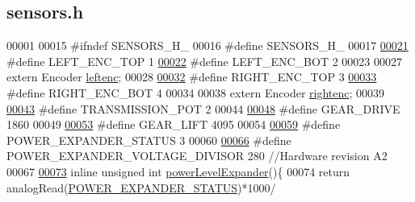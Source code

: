 \hypertarget{sensors_8h_source}{}\subsection{sensors.\+h}
\label{sensors_8h_source}

\begin{DoxyCode}
00001 
00015 \textcolor{preprocessor}{#ifndef SENSORS\_H\_}
00016 \textcolor{preprocessor}{#define SENSORS\_H\_}
00017 
\hypertarget{sensors_8h_source.tex_l00021}{}\hyperlink{sensors_8h_ad0ae0aded49835e75c52bc506585f5a6}{00021} \textcolor{preprocessor}{#define LEFT\_ENC\_TOP 1}
\hypertarget{sensors_8h_source.tex_l00022}{}\hyperlink{sensors_8h_ae913e0b80ef027d0a619e59a3d2ffb85}{00022} \textcolor{preprocessor}{#define LEFT\_ENC\_BOT 2}
00023 
00027 \textcolor{keyword}{extern} Encoder \hyperlink{sensors_8h_a48ead63071a2b65b87a166928a5a5c08}{leftenc};
00028 
\hypertarget{sensors_8h_source.tex_l00032}{}\hyperlink{sensors_8h_a07c1c0ceab9fee6088955b2b2706e515}{00032} \textcolor{preprocessor}{#define RIGHT\_ENC\_TOP 3}
\hypertarget{sensors_8h_source.tex_l00033}{}\hyperlink{sensors_8h_a76290ef36d8c093e1d380e26d1d01f6a}{00033} \textcolor{preprocessor}{#define RIGHT\_ENC\_BOT 4}
00034 
00038 \textcolor{keyword}{extern} Encoder \hyperlink{sensors_8h_a8c853ba918673c4878ab6935c54969e4}{rightenc};
00039 
\hypertarget{sensors_8h_source.tex_l00043}{}\hyperlink{sensors_8h_a4df8b77c0d00d0604d3e8d0fd5fa5d40}{00043} \textcolor{preprocessor}{#define TRANSMISSION\_POT 2}
00044 
\hypertarget{sensors_8h_source.tex_l00048}{}\hyperlink{sensors_8h_aaaba487ef4204a2d1755d80994bb04ca}{00048} \textcolor{preprocessor}{#define GEAR\_DRIVE 1860}
00049 
\hypertarget{sensors_8h_source.tex_l00053}{}\hyperlink{sensors_8h_a3b1b936537462c395fee9c9785dfc9a1}{00053} \textcolor{preprocessor}{#define GEAR\_LIFT 4095}
00054 
\hypertarget{sensors_8h_source.tex_l00059}{}\hyperlink{sensors_8h_a0f128e79b5e93af55f4b30b0bedcea3f}{00059} \textcolor{preprocessor}{#define POWER\_EXPANDER\_STATUS 3}
00060 
\hypertarget{sensors_8h_source.tex_l00066}{}\hyperlink{sensors_8h_a3fbd303e783c833bf2812682e0905188}{00066} \textcolor{preprocessor}{#define POWER\_EXPANDER\_VOLTAGE\_DIVISOR 280 //Hardware revision A2}
00067 
\hypertarget{sensors_8h_source.tex_l00073}{}\hyperlink{sensors_8h_af8de9fe9eba1282f34dce42deebffc93}{00073} \textcolor{keyword}{inline} \textcolor{keywordtype}{unsigned} \textcolor{keywordtype}{int} \hyperlink{sensors_8h_af8de9fe9eba1282f34dce42deebffc93}{powerLevelExpander}()\{
00074     \textcolor{keywordflow}{return} analogRead(\hyperlink{sensors_8h_a0f128e79b5e93af55f4b30b0bedcea3f}{POWER\_EXPANDER\_STATUS})*1000/

\end{DoxyCode}
